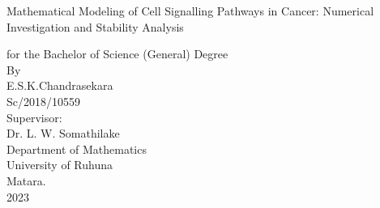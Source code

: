 \thispagestyle{empty}
\begin{center}
\vspace*{1cm}
{\huge Mathematical Modeling of Cell Signalling Pathways in Cancer: Numerical Investigation and Stability Analysis}

\vspace*{1.5cm}
\large { for the Bachelor of Science (General) Degree \\By\\E.S.K.Chandrasekara\\Sc/2018/10559}\\
\vspace{1.3cm}
\large {Supervisor:\\ Dr. L. W. Somathilake }\\
\vspace{1.9cm}
\large{Department of Mathematics}\\
\large{University of Ruhuna}\\
\large{Matara.}\\
\vspace{0.5cm}
\large{2023}
\end{center}




